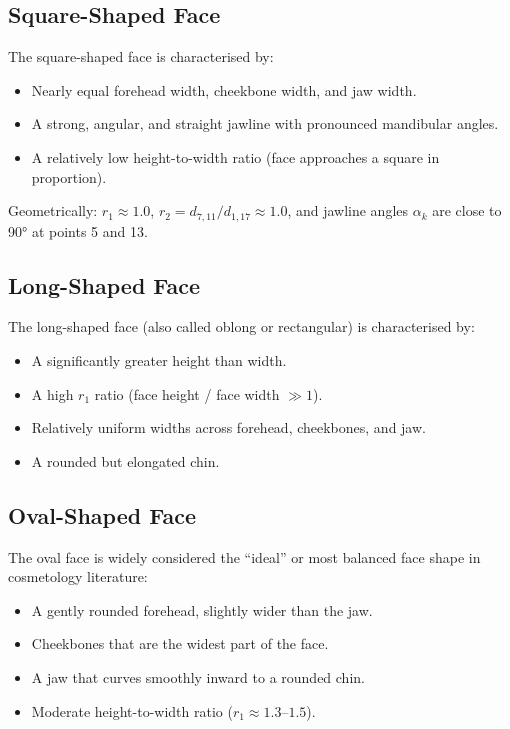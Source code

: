 \subsection{Square-Shaped Face}
The square-shaped face is characterised by:
\begin{itemize}
    \item Nearly equal forehead width, cheekbone width, and jaw width.
    \item A strong, angular, and straight jawline with pronounced mandibular angles.
    \item A relatively low height-to-width ratio (face approaches a square in proportion).
\end{itemize}
Geometrically: $r_1 \approx 1.0$, $r_2 = d_{7,11}/d_{1,17} \approx 1.0$, and jawline angles $\alpha_k$ are close to 90° at points 5 and 13.

\subsection{Long-Shaped Face}
The long-shaped face (also called oblong or rectangular) is characterised by:
\begin{itemize}
    \item A significantly greater height than width.
    \item A high $r_1$ ratio (face height / face width $\gg 1$).
    \item Relatively uniform widths across forehead, cheekbones, and jaw.
    \item A rounded but elongated chin.
\end{itemize}

\subsection{Oval-Shaped Face}
The oval face is widely considered the ``ideal'' or most balanced face shape in cosmetology literature:
\begin{itemize}
    \item A gently rounded forehead, slightly wider than the jaw.
    \item Cheekbones that are the widest part of the face.
    \item A jaw that curves smoothly inward to a rounded chin.
    \item Moderate height-to-width ratio ($r_1 \approx 1.3$--$1.5$).
\end{itemize}

